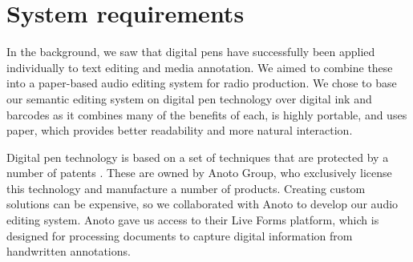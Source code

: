 




\section{System requirements}\label{sec:paper-requirements}

In the background, we saw that digital pens have successfully been applied individually to text editing and media
annotation. We aimed to combine these into a paper-based audio editing system for radio production. We chose to base
our semantic editing system on digital pen technology over digital ink and barcodes as it combines many of the benefits
of each, is highly portable, and uses paper, which provides better readability and more natural interaction.

Digital pen technology is based on a set of techniques that are protected by a number of patents \citep{Fahraeus2003}.
These are owned by Anoto Group, who exclusively license this technology and manufacture a number of products. Creating
custom solutions can be expensive, so we collaborated with Anoto to develop our audio editing system.  Anoto gave us
access to their Live Forms platform, which is designed for processing documents to capture digital information from
handwritten annotations.


